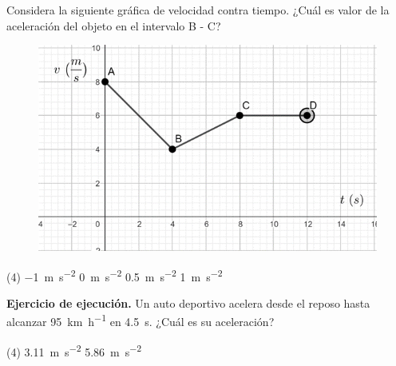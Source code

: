 \documentclass[12pt, letter]{exam}
\begin{document}
\begin{questions}
    \question Considera la siguiente gráfica de velocidad contra tiempo. ¿Cuál es valor de la aceleración del objeto en el intervalo B - C?
    \begin{figure}[H]
        \centering
        \includegraphics[scale=1.5]{Examen_Grafica_02.png}
    \end{figure}
    \begin{tasks}(4)
        \task \SI{-1}{\meter\per\square\second}
        \task \SI{0}{\meter\per\square\second}
        \task \SI{0.5}{\meter\per\square\second}
        \task \SI{1}{\meter\per\square\second}
    \end{tasks}
    \question \label{Ejercicio_03} \textbf{Ejercicio de ejecución.} Un auto deportivo acelera desde el reposo hasta alcanzar \SI{95}{\kilo\meter\per\hour} en \SI{4.5}{\second}. ¿Cuál es su aceleración?
    \begin{tasks}(4)
        \task \SI{3.11}{\meter\per\square\second}
        \task \SI{5.86}{\meter\per\square\second}

\end{tasks}
\end{questions}
\end{document}
